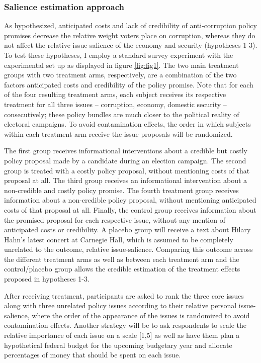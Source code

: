 \documentclass[11pt]{article}
\begin{document}
\subsubsection{Salience estimation approach}
As hypothesized, anticipated costs and lack of credibility of anti-corruption policy promises decrease the relative weight voters place on corruption, whereas they do not affect the relative issue-salience of the economy and security (hypotheses 1-3). To test these hypotheses, I employ a standard survey experiment with the experimental set up as displayed in figure \ref{fig:fig1}. The two main treatment groups with two treatment arms, respectively, are a combination of the two factors anticipated costs and credibility of the policy promise. Note that for each of the four resulting treatment arms, each subject receives its respective treatment for all three issues -- corruption, economy, domestic security -- consecutively; these policy bundles are much closer to the political reality of electoral campaigns. To avoid contamination effects, the order in which subjects within each treatment arm receive the issue proposals will be randomized.

The first group receives informational interventions about a credible but costly policy proposal made by a candidate during an election campaign. The second group is treated with a costly policy proposal, without mentioning costs of that proposal at all. The third group receives an informational intervention about a non-credible and costly policy promise. The fourth treatment group receives information about a non-credible policy proposal, without mentioning anticipated costs of that proposal at all. Finally, the control group receives information about the promised proposal for each respective issue, without any mention of anticipated costs or credibility. A placebo group will receive a text about Hilary Hahn's latest concert at Carnegie Hall, which is assumed to be completely unrelated to the outcome, relative issue-salience. Comparing this outcome across the different treatment arms as well as between each treatment arm and the control/placebo group allows the credible estimation of the treatment effects proposed in hypotheses 1-3.

After receiving treatment, participants are asked to rank the three core issues along with three unrelated policy issues according to their relative personal issue-salience, where the order of the appearance of the issues is randomized to avoid contamination effects. Another strategy will be to ask respondents to scale the relative importance of each issue on a scale [1,5] as well as have them plan a hypothetical federal budget for the upcoming budgetary year and allocate percentages of money that should be spent on each issue.
\end{document}
